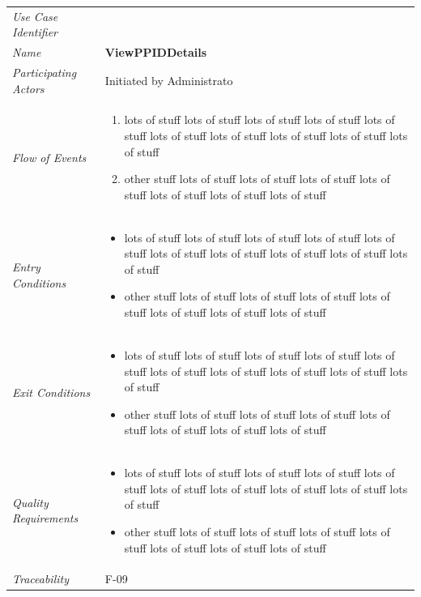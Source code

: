 \documentclass[12pt,letterpaper]{article}
\begin{document}
\begin{center}
	\begin{tabu} to 
		\toprule
		Use Case Identifier & \viewppiddetails{} \\
		Name & {\bf ViewPPIDDetails} \\
		Participating Actors & Initiated by Administrato \\
		Flow of Events & 
	    \begin{enumerate}[topsep=-1em]
		    \item lots of stuff lots of stuff lots of stuff lots of stuff lots of stuff lots of stuff lots of stuff lots of stuff lots of stuff lots of stuff
		    \item other stuff lots of stuff lots of stuff lots of stuff lots of stuff lots of stuff lots of stuff lots of stuff
		\end{enumerate} \\

		Entry Conditions &
		\begin{itemize}[topsep=-1em]
		    \item lots of stuff lots of stuff lots of stuff lots of stuff lots of stuff lots of stuff lots of stuff lots of stuff lots of stuff lots of stuff
		    \item other stuff lots of stuff lots of stuff lots of stuff lots of stuff lots of stuff lots of stuff lots of stuff
        \end{itemize} \\

		Exit Conditions &
		\begin{itemize}[topsep=-1em]
		    \item lots of stuff lots of stuff lots of stuff lots of stuff lots of stuff lots of stuff lots of stuff lots of stuff lots of stuff lots of stuff
		    \item other stuff lots of stuff lots of stuff lots of stuff lots of stuff lots of stuff lots of stuff lots of stuff
        \end{itemize} \\

		Quality Requirements &
		\begin{itemize}[topsep=-1em]
		    \item lots of stuff lots of stuff lots of stuff lots of stuff lots of stuff lots of stuff lots of stuff lots of stuff lots of stuff lots of stuff
		    \item other stuff lots of stuff lots of stuff lots of stuff lots of stuff lots of stuff lots of stuff lots of stuff
        \end{itemize} \\

		Traceability & F-09 \\
		\toprule
	\end{tabu}
\end{center}
\end{document}
